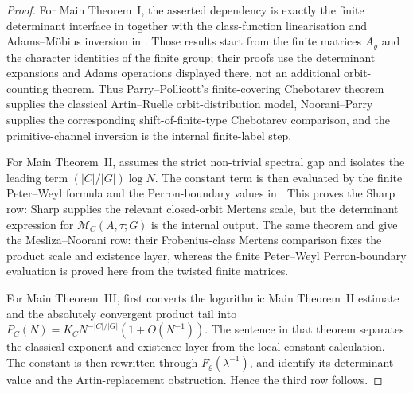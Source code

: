 \documentclass[11pt,a4paper]{amsart}
\theoremstyle{plain}
\theoremstyle{definition}
\theoremstyle{remark}
\begin{document}
\begin{proof}
  For Main Theorem~I, the asserted dependency is exactly the finite determinant
  interface in  together
  with the class-function linearisation and Adams--M\"obius inversion in
  .
  Those results start from the finite matrices \(A_\varrho\) and the character
  identities of the finite group; their proofs use the determinant expansions
  and Adams operations displayed there, not an additional orbit-counting
  theorem.  Thus Parry--Pollicott's finite-covering Chebotarev theorem supplies
  the classical Artin--Ruelle orbit-distribution model, Noorani--Parry supplies
  the corresponding shift-of-finite-type Chebotarev comparison, and the
  primitive-channel inversion is the internal finite-label step.

  For Main Theorem~II,  assumes the strict
  non-trivial spectral gap and isolates the leading term
  \((|C|/|G|)\log N\).  The constant term is then evaluated by the finite
  Peter--Weyl formula and the Perron-boundary values in
  .  This proves the Sharp row: Sharp supplies
  the relevant closed-orbit Mertens scale, but the determinant expression for
  \(\mathcal M_C(A,\tau;G)\) is the internal output.  The same theorem and
   give the Mesliza--Noorani row:
  their Frobenius-class Mertens comparison fixes the product scale and
  existence layer, whereas the finite Peter--Weyl Perron-boundary evaluation is
  proved here from the twisted finite matrices.

  For Main Theorem~III,  first converts
  the logarithmic Main Theorem~II estimate and the absolutely convergent product
  tail into \(P_C(N)=K_C N^{-|C|/|G|}(1+O(N^{-1}))\).  The sentence in that
  theorem separates the classical exponent and existence layer from the local
  constant calculation.  The constant is then rewritten through
  \(F_\varrho(\lambda^{-1})\), and
  identify its determinant value and the Artin-replacement obstruction.  Hence
  the third row follows.


\end{proof}
\end{document}
